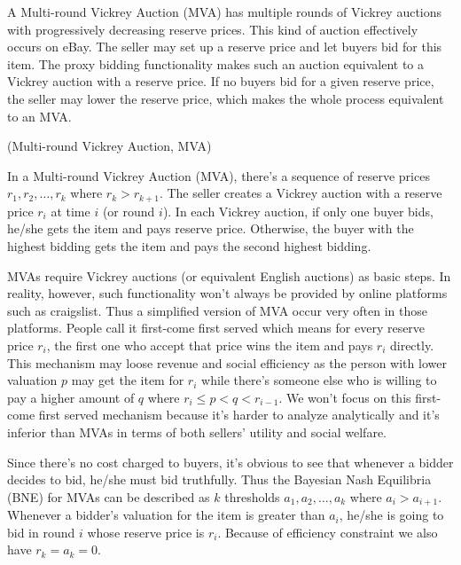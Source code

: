 A Multi-round Vickrey Auction (MVA) has multiple rounds of Vickrey
auctions with progressively decreasing reserve prices. This kind of auction
effectively occurs on eBay. The seller may set up a reserve price and let
buyers bid for this item. The proxy bidding functionality makes such an auction
equivalent to a Vickrey auction with a reserve price. If no buyers bid for a
given reserve price, the seller may lower the reserve price, which makes the
whole process equivalent to an MVA.

\begin{definition}(Multi-round Vickrey Auction, MVA)

In a Multi-round Vickrey Auction (MVA), there's a sequence of reserve prices
$r_1, r_2, \ldots, r_k$ where $r_k > r_{k+1}$. The seller creates a Vickrey
auction with a reserve price $r_i$ at time $i$ (or round $i$). In each
Vickrey auction, if only one buyer bids, he/she gets the item and pays reserve
price. Otherwise, the buyer with the highest bidding gets the item and pays the
second highest bidding.

\end{definition}

MVAs require Vickrey auctions (or equivalent English auctions) as basic steps.
In reality, however, such functionality won't always be provided by online
platforms such as craigslist. Thus a simplified version of MVA occur very often
in those platforms. People call it first-come first served which means for
every reserve price $r_i$, the first one who accept that price wins the item
and pays $r_i$ directly. This mechanism may loose revenue and social efficiency
as the person with lower valuation $p$ may get the item for $r_i$ while there's
someone else who is willing to pay a higher amount of $q$ where $r_i \leq p < q
< r_{i-1}$. We won't focus on this first-come first served mechanism because
it's harder to analyze analytically and it's inferior than MVAs in terms of
both sellers' utility and social welfare.

Since there's no cost charged to buyers, it's obvious to see that whenever a
bidder decides to bid, he/she must bid truthfully. Thus the Bayesian Nash
Equilibria (BNE) for MVAs can be described as $k$ thresholds $a_1, a_2,
\ldots, a_k$ where $a_i > a_{i+1}$. Whenever a bidder's valuation for the item
is greater than $a_i$, he/she is going to bid in round $i$ whose reserve price
is $r_i$. Because of efficiency constraint we also have $r_k = a_k = 0$.

